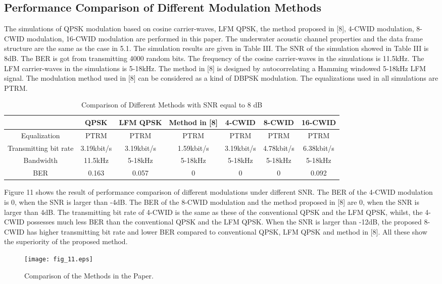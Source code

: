 \documentclass[journal]{IEEEtran}
\begin{document}
\subsection{Performance Comparison of Different Modulation Methods}
The simulations of QPSK modulation based on cosine carrier-waves,
LFM QPSK, the method proposed in [8], 4-CWID modulation, 8-CWID
modulation, 16-CWID modulation are performed in this paper. The
underwater acoustic channel properties and the data frame structure
are the same as the case in 5.1. The simulation results are given in
Table III. The SNR of the simulation showed in Table III is 8dB. The
BER is got from transmitting 4000 random bits. The frequency of the
cosine carrier-waves in the simulations is 11.5kHz. The LFM
carrier-waves in the simulations is 5-18kHz. The method in [8] is
designed by autocorrelating a Hamming windowed 5-18kHz LFM signal.
The modulation method used in [8] can be considered as a kind of
DBPSK modulation. The equalizations used in all simulations are
PTRM.
\begin{table*}[!t]
\renewcommand{\arraystretch}{1.3}
\caption{Comparison of Different Methods with SNR equal to 8 dB}
\label{table_example} \centering
\begin{tabular}{c||c||c||c||c||c||c}
\hline
\bfseries             & \bfseries QPSK    & \bfseries LFM QPSK    & \bfseries Method in [8]    & \bfseries 4-CWID     & \bfseries 8-CWID     & \bfseries 16-CWID\\
\hline\hline
Equalization          & PTRM              & PTRM                  & PTRM                       & PTRM                 & PTRM                 & PTRM\\
Transmitting bit rate & 3.19kbit/s        & 3.19kbit/s            & 1.59kbit/s                 & 3.19kbit/s           & 4.78kbit/s           & 6.38kbit/s\\
Bandwidth             & 11.5kHz           & 5-18kHz               & 5-18kHz                    & 5-18kHz              & 5-18kHz              & 5-18kHz\\
BER                   & 0.163             & 0.057                 & 0                          & 0                    & 0                    & 0.092\\
\hline
\end{tabular}
\end{table*}

Figure 11 shows the result of performance comparison of different
modulations under different SNR. The BER of the 4-CWID modulation is
0, when the SNR is larger than -4dB. The BER of the 8-CWID
modulation and the method proposed in [8] are 0, when the SNR is
larger than 4dB. The transmitting bit rate of 4-CWID is the same as
these of the conventional QPSK and the LFM QPSK, whilst, the 4-CWID
possesses much less BER than the conventional QPSK and the LFM QPSK.
When the SNR is larger than -12dB, the proposed 8-CWID has higher
transmitting bit rate and lower BER compared to conventional QPSK,
LFM QPSK and method in [8]. All these show the superiority of the
proposed method.
\begin{figure}[!t]
\centering
\texttt{[image: fig\_11.eps]}
\caption{Comparison of the Methods in the Paper.} \label{fig_sim}
\end{figure}
\end{document}
